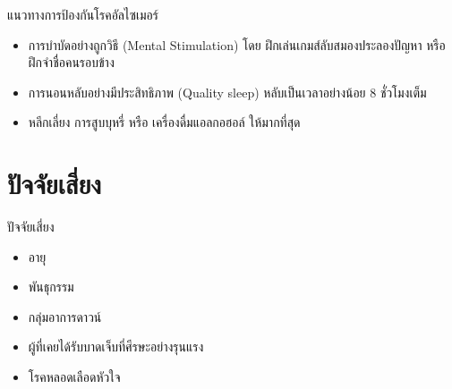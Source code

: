 \documentclass[xetex,serif]{beamer}
\begin{document}
\begin{frame}{แนวทางการป้องกันโรคอัลไซเมอร์}
  \begin{itemize}
    \item การบำบัดอย่างถูกวิธี (Mental Stimulation) โดย ฝึกเล่นเกมส์ลับสมองประลองปัญหา หรือ ฝึกจําชื่อคนรอบข้าง
    \item การนอนหลับอย่างมีประสิทธิภาพ (Quality sleep) หลับเป็นเวลาอย่างน้อย 8 ชั่วโมงเต็ม
    \item หลีกเลี่ยง การสูบบุหรี่ หรือ เครื่องดื่มแอลกอฮอล์ ให้มากที่สุด
  \end{itemize}
\end{frame}

\section{ปัจจัยเสี่ยง}

\begin{frame}{ปัจจัยเสี่ยง}
  \begin{itemize}
    \item อายุ
    \item พันธุกรรม
    \item กลุ่มอาการดาวน์
    \item ผู้ที่เคยได้รับบาดเจ็บที่ศีรษะอย่างรุนแรง
    \item โรคหลอดเลือดหัวใจ
  \end{itemize}
\end{frame}
\end{document}

